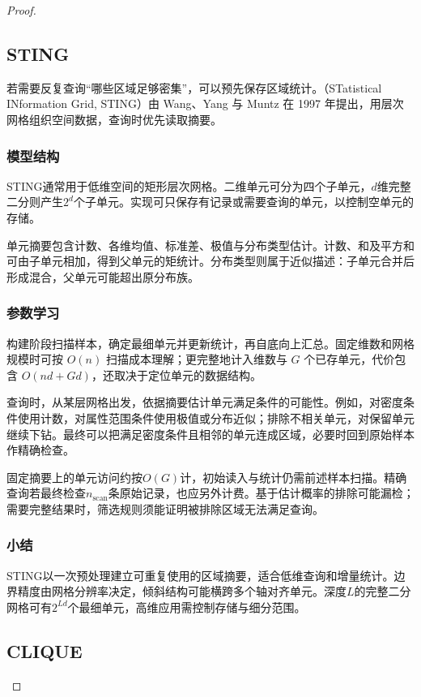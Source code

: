 \begin{proof}
\subsection{STING}

若需要反复查询“哪些区域足够密集”，可以预先保存区域统计。（STatistical INformation Grid, STING）由 Wang、Yang 与 Muntz 在 1997 年提出，用层次网格组织空间数据，查询时优先读取摘要。

\subsubsection{模型结构}

STING通常用于低维空间的矩形层次网格。二维单元可分为四个子单元，$d$维完整二分则产生$2^d$个子单元。实现可只保存有记录或需要查询的单元，以控制空单元的存储。

单元摘要包含计数、各维均值、标准差、极值与分布类型估计。计数、和及平方和可由子单元相加，得到父单元的矩统计。分布类型则属于近似描述：子单元合并后形成混合，父单元可能超出原分布族。

\subsubsection{参数学习}

构建阶段扫描样本，确定最细单元并更新统计，再自底向上汇总。固定维数和网格规模时可按 $O(n)$ 扫描成本理解；更完整地计入维数与 $G$ 个已存单元，代价包含 $O(nd+Gd)$，还取决于定位单元的数据结构。

查询时，从某层网格出发，依据摘要估计单元满足条件的可能性。例如，对密度条件使用计数，对属性范围条件使用极值或分布近似；排除不相关单元，对保留单元继续下钻。最终可以把满足密度条件且相邻的单元连成区域，必要时回到原始样本作精确检查。

固定摘要上的单元访问约按$O(G)$计，初始读入与统计仍需前述样本扫描。精确查询若最终检查$n_{\mathrm{scan}}$条原始记录，也应另外计费。基于估计概率的排除可能漏检；需要完整结果时，筛选规则须能证明被排除区域无法满足查询。

\subsubsection{小结}

STING以一次预处理建立可重复使用的区域摘要，适合低维查询和增量统计。边界精度由网格分辨率决定，倾斜结构可能横跨多个轴对齐单元。深度$L$的完整二分网格可有$2^{Ld}$个最细单元，高维应用需控制存储与细分范围。

\subsection{CLIQUE}
\label{sec:clustering-clique}


\end{proof}

